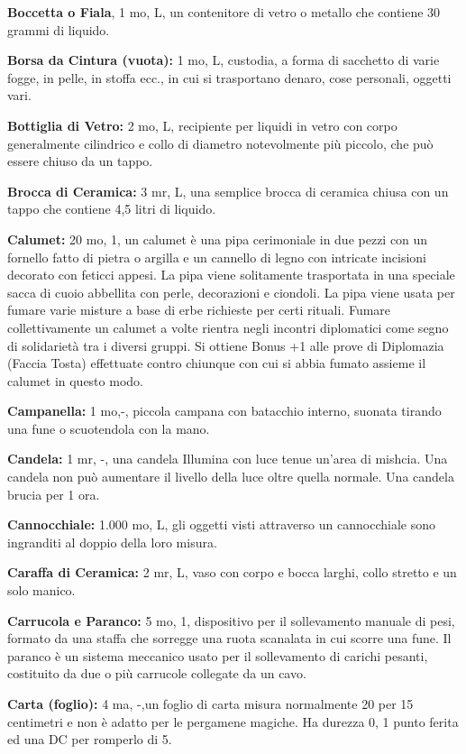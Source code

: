 \documentclass[a4paper,11pt,twoside,openany]{book}
\begin{document}
{\textbf{Boccetta o Fiala}, 1 mo, L, un contenitore di vetro o metallo che contiene 30 grammi di liquido.

\textbf{Borsa da Cintura (vuota):} 1 mo, L, custodia, a forma di sacchetto di varie fogge, in pelle, in stoffa ecc., in cui si trasportano denaro, cose personali, oggetti vari.

\textbf{Bottiglia di Vetro:} 2 mo, L, recipiente per liquidi in vetro con corpo generalmente cilindrico e collo di diametro notevolmente più piccolo, che può essere chiuso da un tappo.

\textbf{Brocca di Ceramica:} 3 mr, L, una semplice brocca di ceramica chiusa con un tappo che contiene 4,5 litri di liquido.

\textbf{Calumet:} 20 mo, 1, un calumet è una pipa cerimoniale in due pezzi con un fornello fatto di pietra o argilla e un cannello di legno con intricate incisioni decorato con feticci appesi. La pipa viene solitamente trasportata in una speciale sacca di cuoio abbellita con perle, decorazioni e ciondoli. La pipa viene usata per fumare varie misture a base di erbe richieste per certi rituali. Fumare collettivamente un calumet a volte rientra negli incontri diplomatici come segno di solidarietà tra i diversi gruppi. Si ottiene Bonus +1 alle prove di Diplomazia (Faccia Tosta) effettuate contro chiunque con cui si abbia fumato assieme il calumet in questo modo.

\textbf{Campanella:} 1 mo,-, piccola campana con batacchio interno, suonata tirando una fune o scuotendola con la mano.

\textbf{Candela:} 1 mr, -, una candela Illumina con luce tenue un'area di mishcia. Una candela non può aumentare il livello della luce oltre quella normale. Una candela brucia per 1 ora.

\textbf{Cannocchiale:} 1.000 mo, L, gli oggetti visti attraverso un cannocchiale sono ingranditi al doppio della loro misura.

\textbf{Caraffa di Ceramica:} 2 mr, L, vaso con corpo e bocca larghi, collo stretto e un solo manico.

\textbf{Carrucola e Paranco:} 5 mo, 1, dispositivo per il sollevamento manuale di pesi, formato da una staffa che sorregge una ruota scanalata in cui scorre una fune. Il paranco è un sistema meccanico usato per il sollevamento di carichi pesanti, costituito da due o più carrucole collegate da un cavo.

\textbf{Carta (foglio):} 4 ma, -,un foglio di carta misura normalmente 20 per 15 centimetri e non è adatto per le pergamene magiche. Ha durezza 0, 1 punto ferita ed una DC per romperlo di 5.

}
\end{document}
